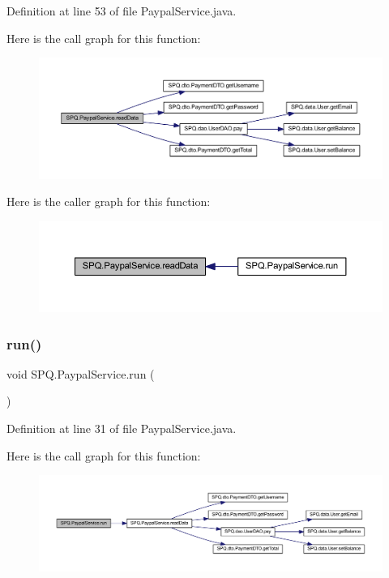 Definition at line 53 of file Paypal\+Service.\+java.

Here is the call graph for this function\+:
\nopagebreak
\begin{figure}[H]
\begin{center}
\leavevmode
\includegraphics[width=350pt]{class_s_p_q_1_1_paypal_service_aae478af6069bf1ffa928b09f2a91328d_cgraph}
\end{center}
\end{figure}
Here is the caller graph for this function\+:
\nopagebreak
\begin{figure}[H]
\begin{center}
\leavevmode
\includegraphics[width=350pt]{class_s_p_q_1_1_paypal_service_aae478af6069bf1ffa928b09f2a91328d_icgraph}
\end{center}
\end{figure}
\mbox{\label{class_s_p_q_1_1_paypal_service_a05e65efee1bcfa26a215ea48b7c8696a}} 
\subsubsection{\texorpdfstring{run()}{run()}}
{\footnotesize\ttfamily void S\+P\+Q.\+Paypal\+Service.\+run (\begin{DoxyParamCaption}{ }\end{DoxyParamCaption})}



Definition at line 31 of file Paypal\+Service.\+java.

Here is the call graph for this function\+:
\nopagebreak
\begin{figure}[H]
\begin{center}
\leavevmode
\includegraphics[width=350pt]{class_s_p_q_1_1_paypal_service_a05e65efee1bcfa26a215ea48b7c8696a_cgraph}
\end{center}
\end{figure}


